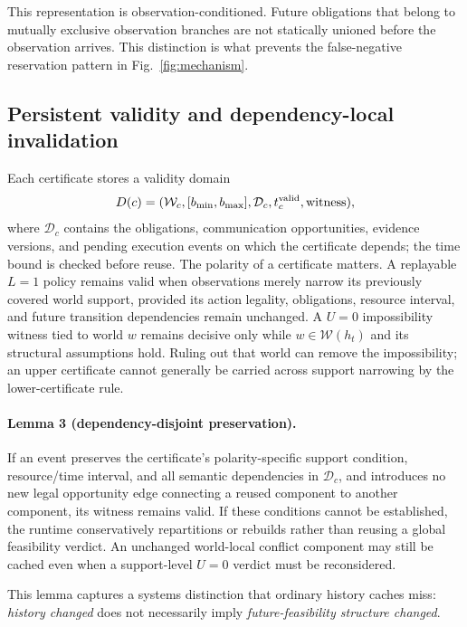 \documentclass[conference]{IEEEtran}
\newcommand{\Worlds}{\mathcal{W}}
\begin{document}
This representation is observation-conditioned. Future obligations that belong to mutually exclusive observation branches are not statically unioned before the observation arrives. This distinction is what prevents the false-negative reservation pattern in Fig.~\ref{fig:mechanism}.

\subsection{Persistent validity and dependency-local invalidation}
Each certificate stores a validity domain
\begin{equation}
D(c)=(\Worlds_c,[b_{\min},b_{\max}],\mathcal D_c,t_c^{\rm valid},\text{witness}),
\end{equation}
where $\mathcal D_c$ contains the obligations, communication opportunities, evidence versions, and pending execution events on which the certificate depends; the time bound is checked before reuse. The polarity of a certificate matters. A replayable $L=1$ policy remains valid when observations merely narrow its previously covered world support, provided its action legality, obligations, resource interval, and future transition dependencies remain unchanged. A $U=0$ impossibility witness tied to world $w$ remains decisive only while $w\in\Worlds(h_t)$ and its structural assumptions hold. Ruling out that world can remove the impossibility; an upper certificate cannot generally be carried across support narrowing by the lower-certificate rule.

\paragraph{Lemma 3 (dependency-disjoint preservation).}
If an event preserves the certificate's polarity-specific support condition, resource/time interval, and all semantic dependencies in $\mathcal D_c$, and introduces no new legal opportunity edge connecting a reused component to another component, its witness remains valid. If these conditions cannot be established, the runtime conservatively repartitions or rebuilds rather than reusing a global feasibility verdict. An unchanged world-local conflict component may still be cached even when a support-level $U=0$ verdict must be reconsidered.

This lemma captures a systems distinction that ordinary history caches miss: \emph{history changed} does not necessarily imply \emph{future-feasibility structure changed}.
\end{document}
